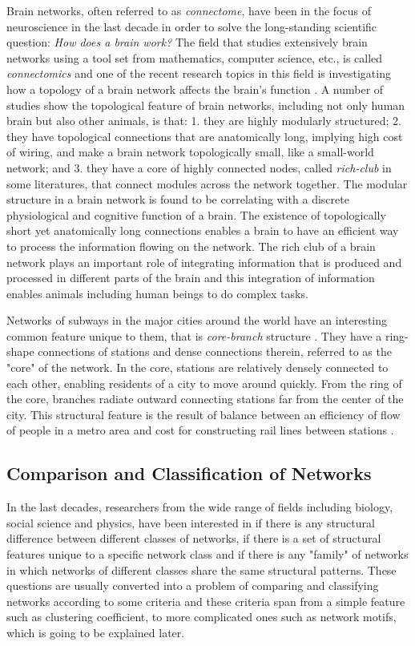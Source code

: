 \documentclass{article}
\begin{document}
Brain networks, often referred to as \textit{connectome}, have been in the focus of neuroscience in the last decade in order to solve the long-standing scientific question: \textit{How does a brain work?}  The field that studies extensively brain networks using a tool set from mathematics, computer science, etc., is called \textit{connectomics} and one of the recent research topics in this field is investigating how a topology of a brain network affects the brain's function \cite{ComparativeConnectome}. A number of studies show the topological feature of brain networks, including not only human brain but also other animals, is that: 1. they are highly modularly structured; 2. they have topological connections that are anatomically long, implying high cost of wiring, and make a brain network topologically small, like a small-world network; and 3. they have a core of highly connected nodes, called \textit{rich-club} in some literatures, that connect modules across the network together. The modular structure in a brain network is found to be correlating with a discrete physiological and cognitive function of a brain. The existence of topologically short yet anatomically long connections enables a brain to have an efficient way to process the information flowing on the network. The rich club of a brain network plays an important role of integrating information that is produced and processed in different parts of the brain and this integration of information enables animals including human beings to do complex tasks.

Networks of subways in the major cities around the world have an interesting common feature unique to them, that is \textit{core-branch} structure \cite{Train}. They have a ring-shape connections of stations and dense connections therein, referred to as the "core" of the network. In the core, stations are relatively densely connected to each other, enabling residents of a city to move around quickly. From the ring of the core, branches radiate outward connecting stations far from the center of the city. This structural feature is the result of balance between an efficiency of flow of people in a metro area and cost for constructing rail lines between stations \cite{SpatioalNetwork1,SpatioalNetwork2}. 


	
	\subsection{Comparison and Classification of Networks}
	 In the last decades, researchers from the wide range of fields including biology, social science and physics, have been interested in if there is any structural difference between different classes of networks, if there is a set of structural features unique to a specific network class and if there is any "family" of networks in which networks of different classes share the same structural patterns. These questions are usually converted into a problem of comparing and classifying networks according to some criteria and these criteria span from a simple feature such as clustering coefficient, to more complicated ones such as network motifs, which is going to be explained later.
	
\end{document}
